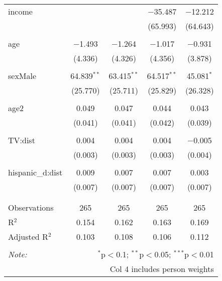 \begin{table}[!htbp]
\begin{tabular}{@{\extracolsep{-5pt}}lcccc}
 income &  &  & $-$35.487 & $-$12.212 \\ 
  &  &  & (65.993) & (64.643) \\ 
  & & & & \\ 
 age & $-$1.493 & $-$1.264 & $-$1.017 & $-$0.931 \\ 
  & (4.336) & (4.326) & (4.356) & (3.878) \\ 
  & & & & \\ 
 sexMale & 64.839$^{**}$ & 63.415$^{**}$ & 64.517$^{**}$ & 45.081$^{*}$ \\ 
  & (25.770) & (25.711) & (25.829) & (26.328) \\ 
  & & & & \\ 
 age2 & 0.049 & 0.047 & 0.044 & 0.043 \\ 
  & (0.041) & (0.041) & (0.042) & (0.039) \\ 
  & & & & \\ 
 TV:dist & 0.004 & 0.004 & 0.004 & $-$0.005 \\ 
  & (0.003) & (0.003) & (0.003) & (0.004) \\ 
  & & & & \\ 
 hispanic\_d:dist & 0.009 & 0.007 & 0.007 & 0.003 \\ 
  & (0.007) & (0.007) & (0.007) & (0.007) \\ 
  & & & & \\ 
\hline \\[-1.8ex] 
Observations & 265 & 265 & 265 & 265 \\ 
R$^{2}$ & 0.154 & 0.162 & 0.163 & 0.169 \\ 
Adjusted R$^{2}$ & 0.103 & 0.108 & 0.106 & 0.112 \\ 
\hline 
\hline \\[-1.8ex] 
\textit{Note:}  & \multicolumn{4}{r}{$^{*}$p$<$0.1; $^{**}$p$<$0.05; $^{***}$p$<$0.01} \\ 
 & \multicolumn{4}{r}{Col 4 includes person weights} \\ 
\end{tabular} 
\end{table} 

